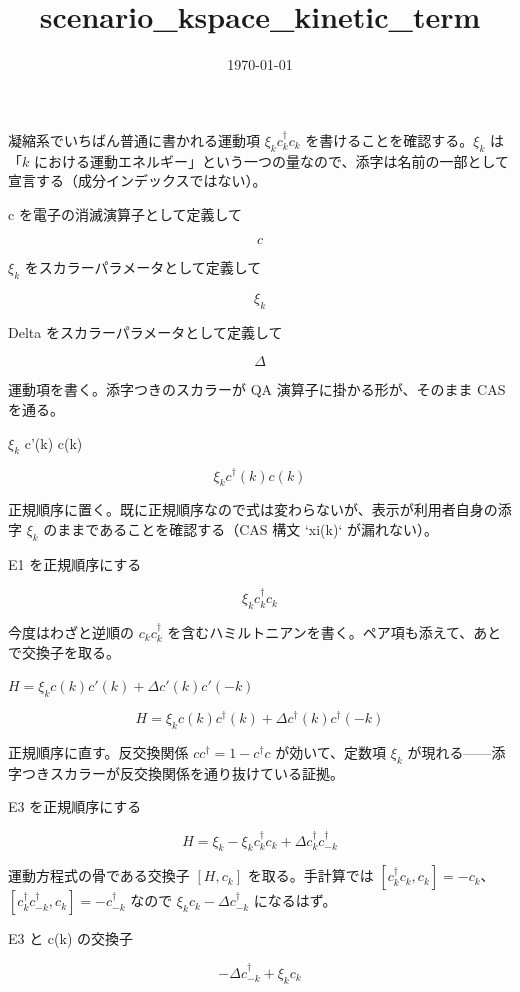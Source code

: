 \documentclass[dvipdfmx,a4paper,11pt]{jsarticle}
\title{scenario\_kspace\_kinetic\_term}
\date{\today}
\begin{document}
\maketitle

凝縮系でいちばん普通に書かれる運動項 $\xi_k c^\dagger_k c_k$ を書けることを確認する。$\xi_k$ は「$k$ における運動エネルギー」という一つの量なので、添字は名前の一部として宣言する（成分インデックスではない）。

c を電子の消滅演算子として定義して

\[
  c
\]

$\xi_{k}$ をスカラーパラメータとして定義して

\[
  \xi_{k}
\]

Delta をスカラーパラメータとして定義して

\[
  \Delta
\]

運動項を書く。添字つきのスカラーが QA 演算子に掛かる形が、そのまま CAS を通る。

$\xi_{k}$ c'(k) c(k)

\begin{equation}
  \xi_{k} c^{\dagger}(k) c(k)
  \label{eq:E1}
\end{equation}

正規順序に置く。既に正規順序なので式は変わらないが、表示が利用者自身の添字 $\xi_k$ のままであることを確認する（CAS 構文 `xi(k)` が漏れない）。

E1 を正規順序にする

\begin{equation}
  \xi_{k} {c}_{k}^{\dagger} {c}_{k}
  \label{eq:E2}
\end{equation}

今度はわざと逆順の $c_k c^\dagger_k$ を含むハミルトニアンを書く。ペア項も添えて、あとで交換子を取る。

$H = \xi_{k} c(k) c'(k) + \Delta c'(k) c'(-k)$

\begin{equation}
  H = \xi_{k} c(k) c^{\dagger}(k) + \Delta c^{\dagger}(k) c^{\dagger}(-k)
  \label{eq:E3}
\end{equation}

正規順序に直す。反交換関係 $c c^\dagger = 1 - c^\dagger c$ が効いて、定数項 $\xi_k$ が現れる——添字つきスカラーが反交換関係を通り抜けている証拠。

E3 を正規順序にする

\begin{equation}
  H = \xi_{k} -  \xi_{k} c^{\dagger}_{k} c_{k} + \Delta c^{\dagger}_{k} c^{\dagger}_{-k}
  \label{eq:E4}
\end{equation}

運動方程式の骨である交換子 $[H, c_k]$ を取る。手計算では $[c^\dagger_k c_k, c_k]=-c_k$、$[c^\dagger_k c^\dagger_{-k}, c_k]=-c^\dagger_{-k}$ なので $\xi_k c_k - \Delta c^\dagger_{-k}$ になるはず。

E3 と c(k) の交換子

\begin{equation}
  - \Delta c^{\dagger}_{-k} + \xi_{k} c_{k}
  \label{eq:E5}
\end{equation}
\end{document}
